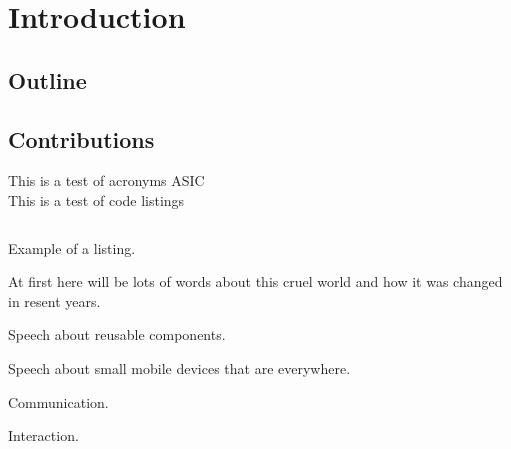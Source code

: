 \newpage
\section{Introduction}
\subsection{Outline}
\subsection{Contributions}



This is a test of acronyms  \gls{ASIC} \\

This is a test of code listings
\begin{listing}[H]
	\inputminted[linenos=true,
	fistline=32,
	firstnumber=32,
	lastline=60]{java}{../source/CoffeeMachineViaBlueTooth.java}
	\caption{Example of a listing.}
	\label{lst:example}
\end{listing}


At first here will be lots of words about this cruel world and how it was
changed in resent years.

Speech about reusable components.

Speech about small mobile devices that are everywhere.


Communication.

Interaction.


